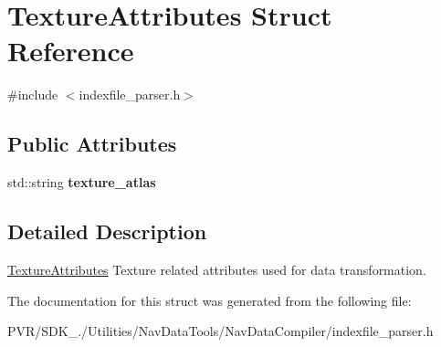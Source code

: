 \hypertarget{struct_texture_attributes}{\section{Texture\+Attributes Struct Reference}
\label{struct_texture_attributes}
}


{\ttfamily \#include $<$indexfile\+\_\+parser.\+h$>$}

\subsection*{Public Attributes}
\begin{DoxyCompactItemize}
\item 
\hypertarget{struct_texture_attributes_a8f00de6d71baacc4fae1e9736cce00c7}{std\+::string {\bfseries texture\+\_\+atlas}}\label{struct_texture_attributes_a8f00de6d71baacc4fae1e9736cce00c7}

\end{DoxyCompactItemize}


\subsection{Detailed Description}


  \hyperlink{struct_texture_attributes}{Texture\+Attributes}  Texture related attributes used for data transformation. 

The documentation for this struct was generated from the following file\+:\begin{DoxyCompactItemize}
\item 
P\+V\+R/\+S\+D\+K\+\_./\+Utilities/\+Nav\+Data\+Tools/\+Nav\+Data\+Compiler/indexfile\+\_\+parser.\+h\end{DoxyCompactItemize}
